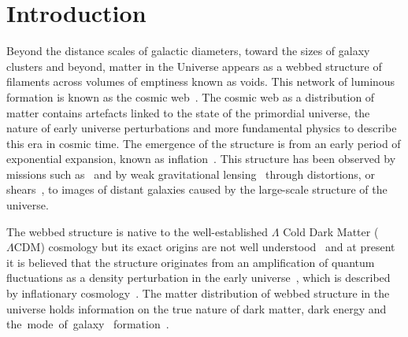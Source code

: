 \documentclass[twocolumn]{article}
\numberwithin{equation}{section}
\begin{document}


\section{Introduction}
Beyond the distance scales of galactic diameters, toward the sizes of galaxy clusters and beyond, matter in the Universe 
appears as a webbed structure of filaments across volumes of emptiness known as voids. This network of luminous formation 
is known as the cosmic web~\cite{bond_cw1, Coles_cw2, Forero_cw3, Dietrich_cw4, cw_phenomenon}. The cosmic web as a 
distribution of matter contains artefacts linked to the state of the primordial universe, the nature of early universe 
perturbations and more fundamental physics to describe this era in cosmic time. The emergence of the structure is from 
an early period of exponential expansion, known as inflation~\cite{inflation_cosmo2}. This structure has been observed by 
missions such as~\cite{sdss1, 2df} and by weak gravitational lensing~\cite{glens_book} through distortions, or 
shears~\cite{shear_review}, to images of distant galaxies caused by the large-scale structure of the universe. 

The webbed structure is native to the well-established $\Lambda$ Cold Dark Matter ($\Lambda \text{CDM}$) cosmology but 
its exact origins are not well understood~\cite{class_perturbs} and at present it is believed that the structure originates 
from an amplification of quantum fluctuations as a density perturbation in the early universe~\cite{perturbation_theory}, 
which is described by inflationary cosmology~\cite{inflation_cosmology}. The matter distribution of webbed structure in 
the universe holds information on the true nature of dark matter, dark energy and the~mode~of~galaxy~ 
formation~\cite{DarkEnergySurvey, kids_lensing, kids_cosmo, gal_formation, gal_formation2}.
\end{document}
